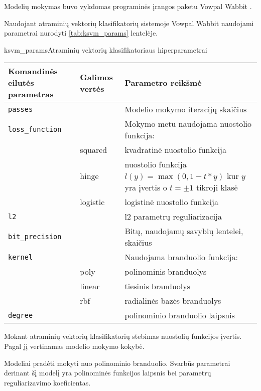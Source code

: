 
Modelių mokymas buvo vykdomas programinės įrangos paketu Vowpal Wabbit \cite{vw}.


Naudojant atraminių vektorių klasifikatorių sistemoje Vowpal Wabbit naudojami parametrai nurodyti \vref{tab:ksvm_params} lentelėje.

\begin{ktutable}{ksvm_params}{Atraminių vektorių klasifikatoriaus hiperparametrai}
    \begin{tabular}{| l | l | p{7cm}|}
    \hline
        Komandinės eilutės parametras & Galimos vertės & Parametro reikšmė\\ \hline
        \texttt{passes} &  & Modelio mokymo iteracijų skaičius \\ \hline
        \texttt{loss\_function} &          & Mokymo metu naudojama nuostolio funkcija: \\
                               & squared  & kvadratinė nuostolio funkcija \\
                               & hinge    & nuostolio funkcija $l(y) = \max(0, 1 - t * y)$ kur $y$ yra įvertis o $t = \pm 1$ tikroji klasė  \\
                               & logistic & logistinė nuostolio funkcija \\ \hline
        \texttt{l2} & & l2 parametrų reguliarizacija \\ \hline
        \texttt{bit\_precision} & & Bitų, naudojamų savybių lentelei, skaičius\\ \hline
        \texttt{kernel} & & Naudojama branduolio funkcija:   \\
                       & poly & polinominis branduolys     \\
                       & linear & tiesinis branduolys      \\
                       & rbf & radialinės bazės branduolys \\ \hline
        \texttt{degree} & & polinominio branduolio laipsnis \\ \hline
    \end{tabular}
\end{ktutable}

Mokant atraminių vektorių klasifikatorių stebimas nuostolių funkcijos įvertis. Pagal jį
vertinamas modelio mokymo kokybė.

Modeliai pradėti mokyti nuo polinominio branduolio. Svarbūs parametrai derinant šį modelį yra polinominės
funkcijos laipsnis bei parametrų reguliarizavimo koeficientas.

